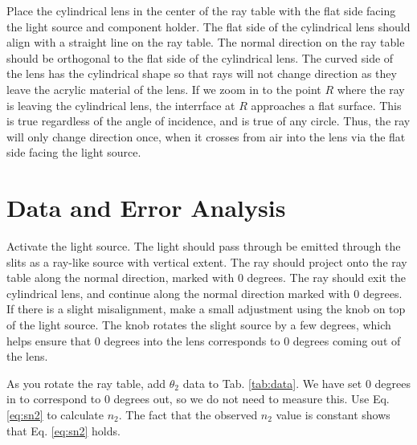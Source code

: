 \documentclass[12pt,twocolumn]{article}
\begin{document}
Place the cylindrical lens in the center of the ray table with the flat side facing the light source and component holder.  The flat side of the cylindrical lens should align with a straight line on the ray table.  The normal direction on the ray table should be orthogonal to the flat side of the cylindrical lens.  The curved side of the lens has the cylindrical shape so that rays will not change direction as they leave the acrylic material of the lens.  If we zoom in to the point $R$ where the ray is leaving the cylindrical lens, the interrface at $R$ approaches a flat surface.  This is true regardless of the angle of incidence, and is true of any circle.  Thus, the ray will only change direction once, when it crosses from air into the lens via the flat side facing the light source.

\section{Data and Error Analysis}

\noindent
Activate the light source.  The light should pass through be emitted through the slits as a ray-like source with vertical extent.  The ray should project onto the ray table along the normal direction, marked with 0 degrees.  The ray should exit the cylindrical lens, and continue along the normal direction marked with 0 degrees.  If there is a slight misalignment, make a small adjustment using the knob on top of the light source.  The knob rotates the slight source by a few degrees, which helps ensure that 0 degrees into the lens corresponds to 0 degrees coming out of the lens.

As you rotate the ray table, add $\theta_2$ data to Tab. \ref{tab:data}.  We have set 0 degrees in to correspond to 0 degrees out, so we do not need to measure this.  Use Eq. \ref{eq:sn2} to calculate $n_2$.  The fact that the observed $n_2$ value is constant shows that Eq. \ref{eq:sn2} holds.
\end{document}
